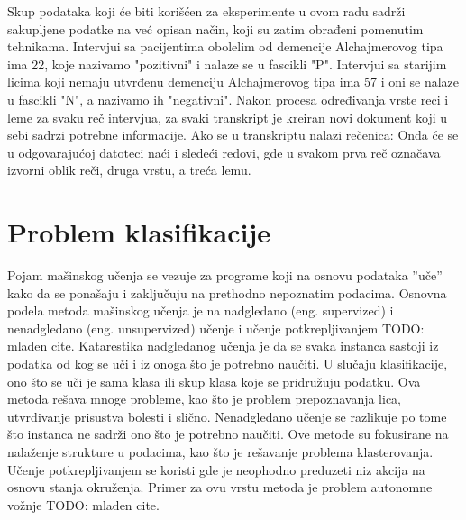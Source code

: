 \documentclass[12pt,oneside]{memoir}
\begin{document}
Skup podataka koji će biti korišćen za eksperimente u ovom radu sadrži sakupljene podatke na već opisan način, koji su zatim obrađeni pomenutim tehnikama. Intervjui sa pacijentima obolelim od demencije Alchajmerovog tipa ima 22, koje nazivamo "pozitivni" i nalaze se u fascikli "P". Intervjui sa starijim licima koji nemaju utvrđenu demenciju Alchajmerovog tipa ima 57 i oni se nalaze u fascikli "N", a nazivamo ih "negativni". Nakon procesa određivanja vrste reci i leme za svaku reč intervjua, za svaki transkript je kreiran novi dokument koji u sebi sadrzi potrebne informacije. Ako se u transkriptu nalazi rečenica:
\newline
\newline
\noindent{}
\newline
\newline
Onda će se u odgovarajućoj datoteci naći i sledeći redovi, gde u svakom prva reč označava izvorni oblik reči, druga vrstu, a treća lemu.
\newline
\newline
\noindent{}
\newline
\newline

\chapter{Problem klasifikacije}

Pojam mašinskog učenja se vezuje za programe koji na osnovu podataka ”uče” kako da se ponašaju i zaključuju na prethodno nepoznatim podacima. Osnovna podela metoda mašinskog učenja je na nadgledano (eng. supervized) i nenadgledano (eng. unsupervized) učenje i učenje potkrepljivanjem TODO: mladen cite. Katarestika nadgledanog učenja je da se svaka instanca sastoji iz podatka od kog se uči i iz onoga što je potrebno naučiti. U slučaju klasifikacije, ono što se uči je sama klasa ili skup klasa koje se pridružuju podatku. Ova metoda rešava mnoge probleme, kao što je problem prepoznavanja lica, utvrđivanje prisustva bolesti i slično. Nenadgledano učenje se razlikuje po tome što instanca ne sadrži ono što je potrebno naučiti. Ove metode su fokusirane na nalaženje strukture u podacima, kao što je rešavanje problema klasterovanja. Učenje potkrepljivanjem se koristi gde je neophodno preduzeti niz akcija na osnovu stanja okruženja. Primer za ovu vrstu metoda je problem autonomne vožnje TODO: mladen cite.
\end{document}

